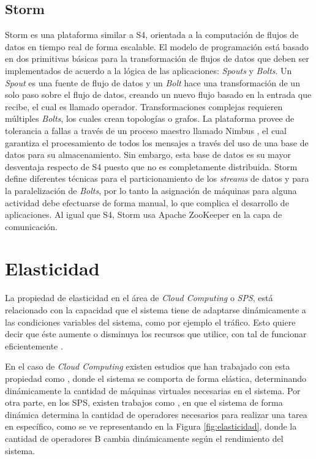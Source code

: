\subsection{Storm}
Storm \citep{bookstorm} es una plataforma similar a S4, orientada a la computación de flujos de datos en tiempo real de forma escalable. El modelo de programación está basado en dos primitivas básicas para la transformación de flujos de datos que deben ser implementados de acuerdo a la lógica de las aplicaciones: \textit{Spouts} y \textit{Bolts}. Un \textit{Spout} es una fuente de flujo de datos y un \textit{Bolt} hace una transformación de un solo paso sobre el flujo de datos, creando un nuevo flujo basado en la entrada que recibe, el cual es llamado operador. Transformaciones complejas requieren múltiples \textit{Bolts}, los cuales crean topologías o grafos. La plataforma provee de tolerancia a fallas a través de un proceso maestro llamado Nimbus \citep{MiaoYJ14}, el cual garantiza el procesamiento de todos los mensajes a través del uso de una base de datos para su almacenamiento. Sin embargo, esta base de datos es su mayor desventaja respecto de S4 puesto que no es completamente distribuida. Storm define diferentes técnicas para el particionamiento de los \textit{streams} de datos y para la paralelización de \textit{Bolts}, por lo tanto la asignación de máquinas para alguna actividad debe efectuarse de forma manual, lo que complica el desarrollo de aplicaciones. Al igual que S4, Storm usa Apache ZooKeeper \citep{HuntKJR10} en la capa de comunicación.

\section{Elasticidad}
\label{sec:elasticidad}

La propiedad de elasticidad en el área de \textit{Cloud Computing} o \textit{SPS}, está relacionado con la capacidad que el sistema tiene de adaptarse dinámicamente a las condiciones variables del sistema, como por ejemplo el tráfico. Esto quiere decir que éste aumente o disminuya los recursos que utilice, con tal de funcionar eficientemente \citep{kelly2014elasticity}.

En el caso de \textit{Cloud Computing} existen estudios que han trabajado con esta propiedad como \citep{GongGW10, NguyenSGSW13, LehrigEB15}, donde el sistema se comporta de forma elástica, determinando dinámicamente la cantidad de máquinas virtuales necesarias en el sistema. Por otra parte, en los SPS, existen trabajos como \citep{GedikSHW14, IshiiS11, SchneiderAGBW09, MadsenTZ14, GulisanoJPSV12}, en que el sistema de forma dinámica determina la cantidad de operadores necesarios para realizar una tarea en específico, como se ve representando en la Figura \ref{fig:elasticidad}, donde la cantidad de operadores B cambia dinámicamente según el rendimiento del sistema.

